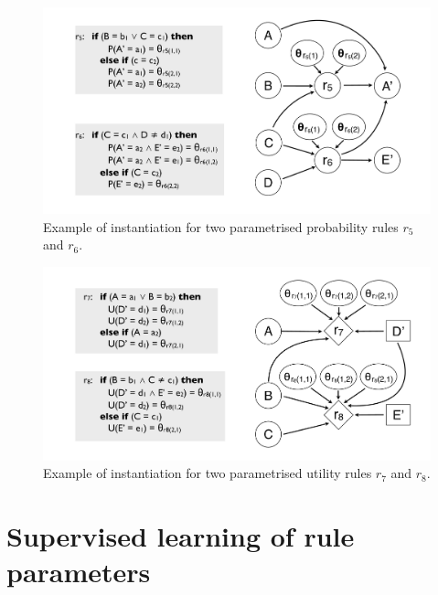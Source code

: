 \begin{figure}[h!]
\centering
\includegraphics[scale=0.25]{imgs/ruleinstantiation_params.pdf}
\caption{Example of instantiation for two parametrised probability rules $r_5$ and $r_6$.}
\label{fig:ruleinstantiation_params}
\end{figure}


\begin{figure}[h!]
\centering
\includegraphics[scale=0.25]{imgs/ruleinstantiation2_params.pdf}
\caption{Example of instantiation for two parametrised utility rules $r_7$ and $r_8$.}
\label{fig:ruleinstantiation_params2}
\end{figure}

\section{Supervised learning of rule parameters}
\label{sec:rule-supervised}

